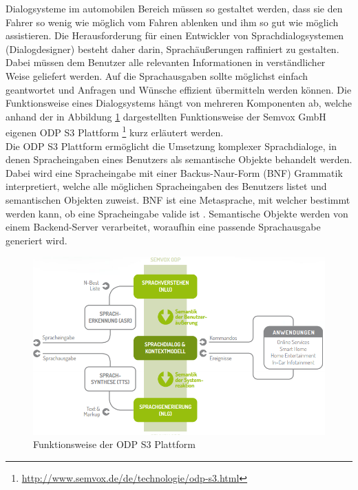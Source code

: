 \documentclass[12pt,a4paper]{scrartcl}
\begin{document}
Dialogsysteme im automobilen Bereich müssen so gestaltet werden, dass sie den Fahrer so wenig wie möglich vom Fahren ablenken und ihm so gut wie möglich assistieren. Die Herausforderung für einen Entwickler von Sprachdialogsystemen (Dialogdesigner) besteht daher darin, Sprachäußerungen raffiniert zu gestalten. Dabei müssen dem Benutzer alle relevanten Informationen in verständlicher Weise geliefert werden. Auf die Sprachausgaben sollte möglichst einfach geantwortet und Anfragen und Wünsche effizient übermitteln werden können. Die Funktionsweise eines Dialogsystems hängt von mehreren Komponenten ab, welche anhand der in Abbildung \ref{odps3} dargestellten Funktionsweise der Semvox GmbH eigenen ODP S3 Plattform \footnote{\label{foot:odps3}\url{http://www.semvox.de/de/technologie/odp-s3.html}} kurz erläutert werden. \\
Die ODP S3 Plattform ermöglicht die Umsetzung komplexer Sprachdialoge, in denen Spracheingaben eines Benutzers als semantische Objekte behandelt werden. Dabei wird eine Spracheingabe mit einer Backus-Naur-Form (BNF) Grammatik interpretiert, welche alle möglichen Spracheingaben des Benutzers listet und semantischen Objekten zuweist. BNF ist eine Metasprache, mit welcher bestimmt werden kann, ob eine Spracheingabe valide ist \cite{BNFref}. Semantische Objekte werden von einem Backend-Server verarbeitet, woraufhin eine passende Sprachausgabe generiert wird. 
\begin{figure}[H]
\begin{center}
\includegraphics[width=14cm]{odps3.png}
\caption{Funktionsweise der ODP S3 Plattform}
\label{odps3}
\end{center}
\end{figure}
\end{document}
